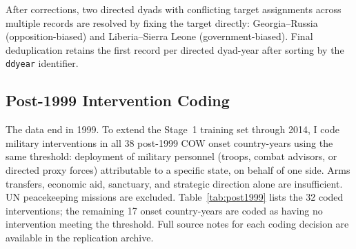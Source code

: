 After corrections, two directed dyads with conflicting target assignments across
multiple records are resolved by fixing the target directly: Georgia--Russia
(opposition-biased) and Liberia--Sierra Leone (government-biased).  Final
deduplication retains the first record per directed dyad-year after sorting by
the \texttt{ddyear} identifier.

\subsection{Post-1999 Intervention Coding}
\label{app:post1999}

The \citet{regan2000} data end in 1999.  To extend the Stage~1 training set through 2014,
I code military interventions in all 38 post-1999 COW onset country-years using the
same threshold: deployment of military personnel (troops, combat advisors, or
directed proxy forces) attributable to a specific state, on behalf of one side.
Arms transfers, economic aid, sanctuary, and strategic direction alone are
insufficient.  UN peacekeeping missions are excluded.  Table~\ref{tab:post1999} lists
the 32 coded interventions; the remaining 17 onset country-years are coded as
having no intervention meeting the threshold.  Full source notes for each
coding decision are available in the replication archive.

